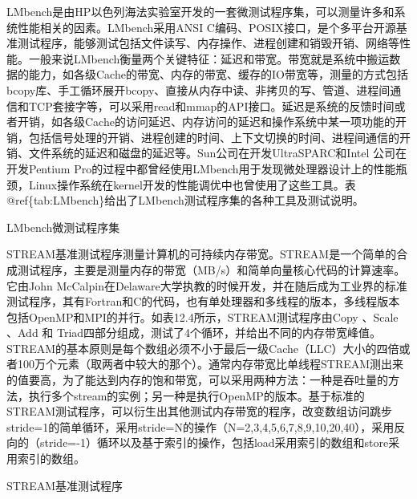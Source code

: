 \documentclass[]{ctexbook}
\begin{document}
LMbench是由HP以色列海法实验室开发的一套微测试程序集，可以测量许多和系统性能相关的因素。LMbench采用ANSI C编码、POSIX接口，是个多平台开源基准测试程序，能够测试包括文件读写、内存操作、进程创建和销毁开销、网络等性能。一般来说LMbench衡量两个关键特征：延迟和带宽。带宽就是系统中搬运数据的能力，如各级Cache的带宽、内存的带宽、缓存的IO带宽等，测量的方式包括bcopy库、手工循环展开bcopy、直接从内存中读、非拷贝的写、管道、进程间通信和TCP套接字等，可以采用read和mmap的API接口。延迟是系统的反馈时间或者开销，如各级Cache的访问延迟、内存访问的延迟和操作系统中某一项功能的开销，包括信号处理的开销、进程创建的时间、上下文切换的时间、进程间通信的开销、文件系统的延迟和磁盘的延迟等。Sun公司在开发UltraSPARC和Intel 公司在开发Pentium Pro的过程中都曾经使用LMbench用于发现微处理器设计上的性能瓶颈，Linux操作系统在kernel开发的性能调优中也曾使用了这些工具。表@ref\{tab:LMbench\}给出了LMbench测试程序集的各种工具及测试说明。

\label{tab:LMbench}LMbench微测试程序集

STREAM基准测试程序测量计算机的可持续内存带宽。STREAM是一个简单的合成测试程序，主要是测量内存的带宽（MB/s）和简单向量核心代码的计算速率。它由John McCalpin在Delaware大学执教的时候开发，并在随后成为工业界的标准测试程序，其有Fortran和C的代码，也有单处理器和多线程的版本，多线程版本包括OpenMP和MPI的并行。如表12.4所示，STREAM测试程序由Copy 、Scale 、Add 和 Triad四部分组成，测试了4个循环，并给出不同的内存带宽峰值。STREAM的基本原则是每个数组必须不小于最后一级Cache（LLC）大小的四倍或者100万个元素（取两者中较大的那个）。通常内存带宽比单线程STREAM测出来的值要高，为了能达到内存的饱和带宽，可以采用两种方法：一种是吞吐量的方法，执行多个stream的实例；另一种是执行OpenMP的版本。基于标准的STREAM测试程序，可以衍生出其他测试内存带宽的程序，改变数组访问跳步stride=1的简单循环，采用stride=N的操作（N=2,3,4,5,6,7,8,9,10,20,40），采用反向的（stride=-1）循环以及基于索引的操作，包括load采用索引的数组和store采用索引的数组。

\label{tab:STREAM}STREAM基准测试程序
\end{document}
